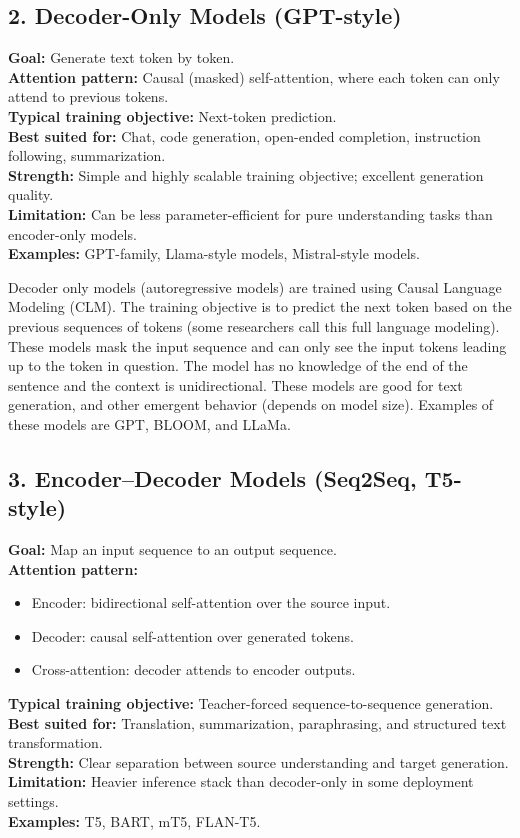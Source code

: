 \documentclass[12pt]{report}
\begin{document}
\subsection*{2. Decoder-Only Models (GPT-style)}
\textbf{Goal:} Generate text token by token.\\
\textbf{Attention pattern:} Causal (masked) self-attention, where each token can only attend to previous tokens.\\
\textbf{Typical training objective:} Next-token prediction.\\
\textbf{Best suited for:} Chat, code generation, open-ended completion, instruction following, summarization.\\
\textbf{Strength:} Simple and highly scalable training objective; excellent generation quality.\\
\textbf{Limitation:} Can be less parameter-efficient for pure understanding tasks than encoder-only models.\\
\textbf{Examples:} GPT-family, Llama-style models, Mistral-style models.

Decoder only models (autoregressive models) are trained using Causal Language Modeling (CLM). The training objective is to predict the next token based on the previous sequences of tokens (some researchers call this full language modeling). These models mask the input sequence and can only see the input tokens leading up to the token in question. The model has no knowledge of the end of the sentence and the context is unidirectional. These models are good for text generation, and other emergent behavior (depends on model size). Examples of these models are GPT, BLOOM, and LLaMa.


\subsection*{3. Encoder--Decoder Models (Seq2Seq, T5-style)}
\textbf{Goal:} Map an input sequence to an output sequence.\\
\textbf{Attention pattern:}
\begin{itemize}
	\item Encoder: bidirectional self-attention over the source input.
	\item Decoder: causal self-attention over generated tokens.
	\item Cross-attention: decoder attends to encoder outputs.
\end{itemize}
\textbf{Typical training objective:} Teacher-forced sequence-to-sequence generation.\\
\textbf{Best suited for:} Translation, summarization, paraphrasing, and structured text transformation.\\
\textbf{Strength:} Clear separation between source understanding and target generation.\\
\textbf{Limitation:} Heavier inference stack than decoder-only in some deployment settings.\\
\textbf{Examples:} T5, BART, mT5, FLAN-T5.
\end{document}
